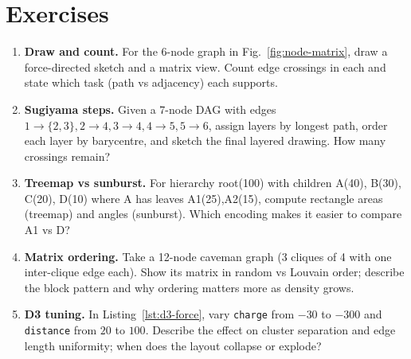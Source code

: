 \section{Exercises}
\label{sec:ch05-exercises}
\begin{enumerate}[label=E5.\arabic*, leftmargin=*, itemsep=0.8em]
    \item \textbf{Draw and count.} For the 6-node graph in Fig.~\ref{fig:node-matrix}, draw a force-directed sketch and a matrix view. Count edge crossings in each and state which task (path vs adjacency) each supports.
    \item \textbf{Sugiyama steps.} Given a 7-node DAG with edges $1\!\to\!\{2,3\},2\!\to\!4,3\!\to\!4,4\!\to\!5,5\!\to\!6$, assign layers by longest path, order each layer by barycentre, and sketch the final layered drawing. How many crossings remain?
    \item \textbf{Treemap vs sunburst.} For hierarchy root(100) with children A(40), B(30), C(20), D(10) where A has leaves A1(25),A2(15), compute rectangle areas (treemap) and angles (sunburst). Which encoding makes it easier to compare A1 vs D?
    \item \textbf{Matrix ordering.} Take a 12-node caveman graph (3 cliques of 4 with one inter-clique edge each). Show its matrix in random vs Louvain order; describe the block pattern and why ordering matters more as density grows.
    \item \textbf{D3 tuning.} In Listing~\ref{lst:d3-force}, vary \texttt{charge} from $-30$ to $-300$ and \texttt{distance} from $20$ to $100$. Describe the effect on cluster separation and edge length uniformity; when does the layout collapse or explode?
\end{enumerate}
